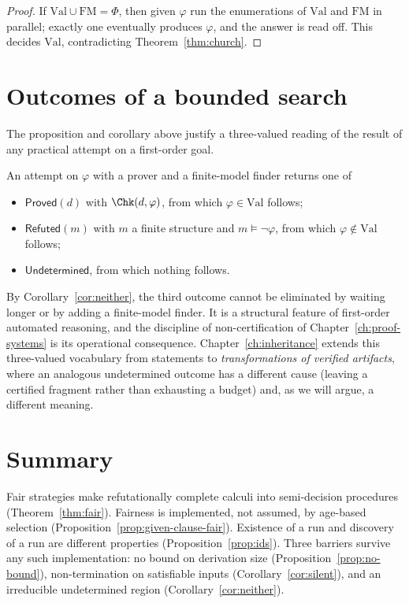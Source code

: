 \begin{proof}
If $\mathrm{Val}\cup\mathrm{FM}=\Phi$, then given $\varphi$ run the enumerations of $\mathrm{Val}$ and $\mathrm{FM}$ in parallel; exactly one eventually produces $\varphi$, and the answer is read off. This decides $\mathrm{Val}$, contradicting Theorem~\ref{thm:church}.
\end{proof}

\section{Outcomes of a bounded search}
\label{sec:outcomes}

The proposition and corollary above justify a three-valued reading of the result of any practical attempt on a first-order goal.

\begin{definition}[Outcomes]
\label{def:outcomes}
An attempt on $\varphi$ with a prover and a finite-model finder returns one of
\begin{itemize}[nosep]
\item $\textsf{Proved}(d)$ with $\Chk(d,\varphi)$, from which $\varphi\in\mathrm{Val}$ follows;
\item $\textsf{Refuted}(m)$ with $m$ a finite structure and $m\models\neg\varphi$, from which $\varphi\notin\mathrm{Val}$ follows;
\item $\textsf{Undetermined}$, from which nothing follows.
\end{itemize}
\end{definition}

By Corollary~\ref{cor:neither}, the third outcome cannot be eliminated by waiting longer or by adding a finite-model finder. It is a structural feature of first-order automated reasoning, and the discipline of non-certification of Chapter~\ref{ch:proof-systems} is its operational consequence. Chapter~\ref{ch:inheritance} extends this three-valued vocabulary from statements to \emph{transformations of verified artifacts}, where an analogous undetermined outcome has a different cause (leaving a certified fragment rather than exhausting a budget) and, as we will argue, a different meaning.

\section{Summary}

Fair strategies make refutationally complete calculi into semi-decision procedures (Theorem~\ref{thm:fair}). Fairness is implemented, not assumed, by age-based selection (Proposition~\ref{prop:given-clause-fair}). Existence of a run and discovery of a run are different properties (Proposition~\ref{prop:ids}). Three barriers survive any such implementation: no bound on derivation size (Proposition~\ref{prop:no-bound}), non-termination on satisfiable inputs (Corollary~\ref{cor:silent}), and an irreducible undetermined region (Corollary~\ref{cor:neither}).

